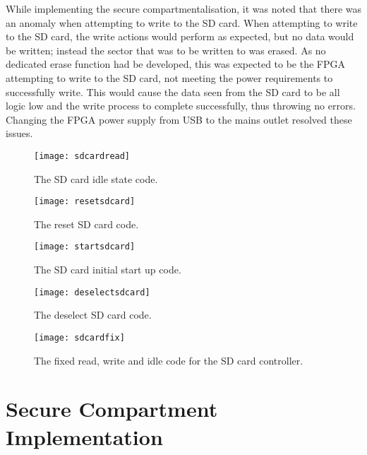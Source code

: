 While implementing the secure compartmentalisation, it was noted that there was an anomaly when attempting to write to the SD card. When attempting to write to the SD card, the write actions would perform as expected, but no data would be written; instead the sector that was to be written to was erased. As no dedicated erase function had be developed, this was expected to be the FPGA attempting to write to the SD card, not meeting the power requirements to successfully write. This would cause the data seen from the SD card to be all logic low and the write process to complete successfully, thus throwing no errors. Changing the FPGA power supply from USB to the mains outlet resolved these issues.

\begin{figure}
  \centering
  \texttt{[image: sdcardread]}
  \caption{The SD card idle state code.}
  \label{fig:sdcardread}
\end{figure}

\begin{figure}
  \centering
  \texttt{[image: resetsdcard]}
  \caption{The reset SD card code.}
  \label{fig:resetsdcard}
\end{figure}

\begin{figure}
  \centering
  \texttt{[image: startsdcard]}
  \caption{The SD card initial start up code.}
  \label{fig:startsdcard}
\end{figure}

\begin{figure}
  \centering
  \texttt{[image: deselectsdcard]}
  \caption{The deselect SD card code.}
  \label{fig:deselectsdcard}
\end{figure}

\begin{figure}
  \centering
  \texttt{[image: sdcardfix]}
  \caption{The fixed read, write and idle code for the SD card controller.}
  \label{fig:sdcardfix}
\end{figure}


\section{Secure Compartment Implementation}

